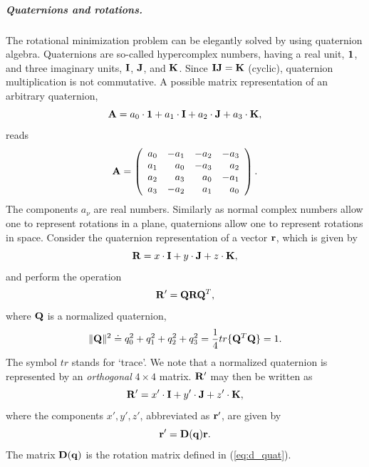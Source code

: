 \documentclass[a4paper,11pt]{report}
\begin{document}
\subparagraph{Quaternions and rotations.} The rotational minimization problem can be elegantly solved by using quaternion algebra.
Quaternions are so-called hypercomplex numbers, having a real unit, ${\bf 1}$, and three imaginary units, 
${\bf I}$, ${\bf J}$, and ${\bf K}$. Since ${\bf I}{\bf J} = {\bf K}$ (cyclic), quaternion multiplication is not commutative. 
A possible matrix representation of an arbitrary quaternion,
\begin{equation}
{\bf A} = a_0\cdot{\bf 1} + a_1\cdot{\bf I} + a_2\cdot{\bf J} + 
          a_3\cdot{\bf K},
\end{equation}
reads 
\begin{equation}
\label{eq:a_mat}
 {\bf A} = \left( \begin{array}{rrrr}
                  a_0 &-a_1 &-a_2 &-a_3 \\
                  a_1 & a_0 &-a_3 & a_2 \\
                  a_2 & a_3 & a_0 &-a_1 \\
                  a_3 &-a_2 & a_1 & a_0
                  \end{array} 
           \right).
\end{equation}
The components $a_\nu$ are real numbers. Similarly as normal complex numbers allow one to represent rotations in a plane, quaternions 
allow one to represent rotations in space. Consider the quaternion representation of a vector ${\bf r}$, which is given by 
\begin{equation}
{\bf R} = x\cdot{\bf I} + y\cdot{\bf J} + z\cdot{\bf K},
\end{equation}  
and perform the operation
\begin{equation}
{\bf R}' = {\bf Q}{\bf R}{\bf Q}^T,
\end{equation}  
where ${\bf Q}$ is a normalized quaternion,
\begin{equation}
\|{\bf Q}\|^2 \doteq
q_0^2 + q_1^2 + q_2^2 + q_3^2 = \frac{1}{4}tr\{{\bf Q}^T{\bf Q}\} = 1. 
\end{equation}
The symbol $tr$ stands for `trace'. We note that a normalized quaternion is represented by an {\em orthogonal} $4\times 4$ 
matrix. ${\bf R}'$ may then be written  as
\begin{equation}
{\bf R}' = x'\cdot{\bf I} + y'\cdot{\bf J} + z'\cdot{\bf K},
\end{equation}
where the components $x',y',z'$, abbreviated as ${\bf r}'$, are given by
\begin{equation}
{\bf r}' = {\bf D}({\bf q}){\bf r}.
\end{equation}
The matrix ${\bf D}({\bf q})$ is the rotation matrix defined in
(\ref{eq:d_quat}).
\end{document}
